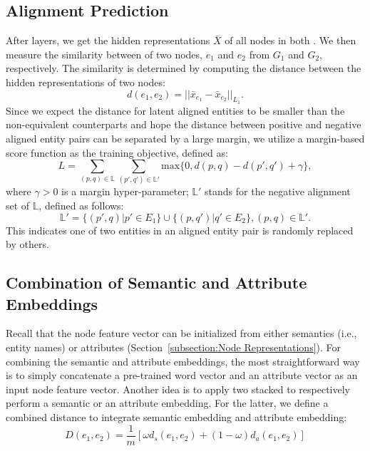 	\subsection{Alignment Prediction\label{prediction}}
	After \HRGCN layers, we get the hidden representations $\bar{X}$ of all nodes in both \KGs. We then measure the similarity between of two
nodes, $e_1$ and $e_2$ from $G_1$ and $G_2$, respectively. The similarity is determined by computing the distance between the hidden
representations of two nodes:
	\begin{equation}
	\label{d}
	d(e_1,e_2)=||\bar{x}_{e_1}-\bar{x}_{e_2}||_{L_1}.
	\end{equation}
	Since we expect the distance for latent aligned entities to be smaller than the non-equivalent counterparts and hope the distance between positive and negative aligned entity pairs can be separated by a large margin, we utilize a margin-based score function as the training objective, defined as:
	\begin{equation}
	L=\sum\limits_{(p,q)\in \mathbb{L}}\sum\limits_{(p',q')\in \mathbb{L'}}\mathrm{max}\{0,d(p,q)-d(p',q')+\gamma\},
	\end{equation}
	where $\gamma > 0$ is a margin hyper-parameter; $\mathbb{L'}$ stands for the negative alignment set of $\mathbb{L}$, defined as follows:
	\begin{equation}
	\mathbb{L'}=\{(p',q)|p'\in E_1\}\cup\{(p,q')|q'\in E_2\}, (p,q)\in \mathbb{L'}.
	\end{equation}
	This indicates one of two entities in an aligned entity pair is randomly replaced by others.
	

	
	\subsection{Combination of Semantic and Attribute Embeddings}
    Recall that the node feature vector can be initialized from either semantics (i.e., entity names) or attributes (Section~\ref{subsection:Node
    Representations}). For combining the semantic and attribute embeddings, the most straightforward way is to simply concatenate a pre-trained word vector and an attribute vector as an input node feature vector. Another idea is to apply two stacked \HRGCNs to respectively perform a semantic or an attribute embedding.
%
	For the latter, we define a combined distance to integrate semantic embedding and attribute embedding:
	\begin{equation}
		D(e_1,e_2)=\frac{1}{m}[\omega d_s(e_1,e_2)+(1-\omega)d_a(e_1,e_2)]
	\end{equation}

